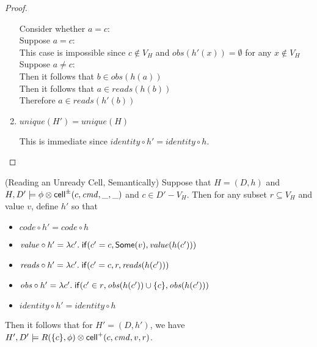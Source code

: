 \begin{proof}
\begin{enumerate}
\begin{tabbedproof}
    \oooo Consider whether $a = c$: \\
    \oooo Suppose $a = c$: \\
    \ooooo This case is impossible since $c \not\in V_H$ and $\mathit{obs}(h'(x)) = \emptyset$ for any $x \not\in V_H$ \\
    \oooo Suppose $a \not= c$: \\
    \ooooo Then it follows that $b \in \mathit{obs}(h(a))$ \\
    \ooooo Then it follows that $a \in \mathit{reads}(h(b))$ \\
    \ooooo Therefore $a \in \mathit{reads}(h'(b))$ 
  \end{tabbedproof}

\item $\mathit{unique}(H') = \mathit{unique}(H)$

This is immediate since $\mathit{identity} \circ h' = \mathit{identity} \circ h$.
\end{enumerate}
\end{proof}

\begin{lemma}{(Reading an Unready Cell, Semantically)}
Suppose that $H = (D,h)$ and $H, D' \models \phi \otimes
\mathsf{cell}^{\pm}({c}, {\mathit{cmd}}, {\_}, {\_})$ and $c \in D' - V_H$. Then for any subset $r
\subseteq V_H$ and value $v$, define $h'$ so that
\begin{itemize}
\item $\mathit{code} \circ h' = \mathit{code} \circ h$ 
\item $\mathit{value} \circ h' = \lambda c'.\;\mathsf{if}({c' = c}, {\mathsf{Some}(v)}, {\mathit{value}(h(c'))})$ 
\item $\mathit{reads} \circ h' = \lambda c'.\;\mathsf{if}({c' = c}, {r}, {\mathit{reads}(h(c'))})$ 
\item $\mathit{obs} \circ h' = \lambda c'.\;\mathsf{if}({c' \in r}, {\mathit{obs}(h(c')) \cup \{{c}\}}, {\mathit{obs}(h(c'))})$ 
\item $\mathit{identity} \circ h' = \mathit{identity} \circ h$
\end{itemize}
Then it follows that for $H' = (D,h')$, we have $H', D' \models R(\{{c}\}, \phi) \otimes \mathsf{cell}^{+}({c}, {\mathit{cmd}}, {v}, {r})$.
\end{lemma}

